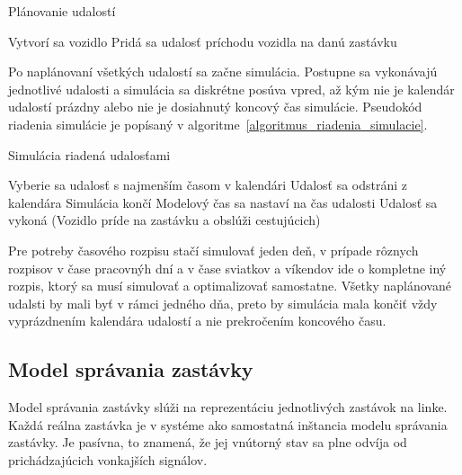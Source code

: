 \vspace*{\dimexpr0.5\baselineskip\relax}
\begin{algorithm}[H]\label{algoritmus_planovanie_udalosti}
  \caption{Plánovanie udalostí}
     {
      Vytvorí sa vozidlo\;
       {
        Pridá sa udalosť príchodu vozidla na danú zastávku\;
      }
    }
\end{algorithm}
\vspace*{\dimexpr0.5\baselineskip\relax}

Po naplánovaní všetkých udalostí sa začne simulácia.
Postupne sa vykonávajú jednotlivé udalosti a simulácia sa diskrétne posúva vpred, až kým nie je kalendár udalostí prázdny alebo nie je dosiahnutý koncový čas simulácie.
Pseudokód riadenia simulácie je popísaný v algoritme~\ref{algoritmus_riadenia_simulacie}.

\vspace*{\dimexpr0.5\baselineskip\relax}
\begin{algorithm}[H]\label{algoritmus_riadenia_simulacie}
\caption{Simulácia riadená udalosťami}
   {
    Vyberie sa udalosť s najmenším časom v kalendári\;
    Udalosť sa odstráni z kalendára\;
     {
      Simulácia končí\;
    }
    Modelový čas sa nastaví na čas udalosti\;
    Udalosť sa vykoná (Vozidlo príde na zastávku a obslúži cestujúcich)\;
  }
\end{algorithm}
\vspace*{\dimexpr0.5\baselineskip\relax}

Pre potreby časového rozpisu stačí simulovať jeden deň, v prípade rôznych rozpisov v čase pracovnýh dní a v čase sviatkov a víkendov ide o kompletne iný rozpis, ktorý sa musí simulovať a optimalizovať samostatne.
Všetky naplánované udalsti by mali byť v rámci jedného dňa, preto by simulácia mala končiť vždy vyprázdnením kalendára udalostí a nie prekročením koncového času.

\subsection*{Model správania zastávky}\label{model_zastavky}

Model správania zastávky slúži na reprezentáciu jednotlivých zastávok na linke.
Každá reálna zastávka je v systéme ako samostatná inštancia modelu správania zastávky.
Je pasívna, to znamená, že jej vnútorný stav sa plne odvíja od prichádzajúcich vonkajších signálov.

